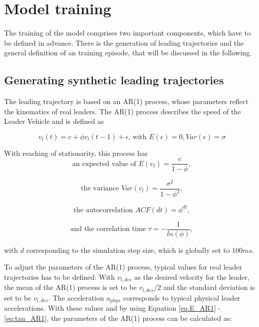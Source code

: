 \documentclass[review]{elsarticle}
\begin{document}
\section{Model training}
The training of the model comprises two important components, which have to be defined in advance. There is the generation of leading trajectories and the general definition of an training episode, that will be discussed in the following.

\subsection{Generating synthetic leading trajectories}
The leading trajectory is based on an AR(1) process, whose parameters reflect the kinematics of real leaders. The AR(1) process describes the speed of the Leader Vehicle and is defined as 

\begin{equation}
	v_l(t) = c+\phi v_l(t-1)+ \epsilon \text{, with } E(\epsilon) = 0, Var(\epsilon) = \sigma 
\end{equation}

With reaching of stationarity, this process has 
\begin{equation}
\label{eq:E_AR1}
 \text{an expected value of }E(v_l) = \frac{c}{1-\phi}, 
 \end{equation}
 
 \begin{equation}
 \label{eq:V_AR1}
 \text{the variance  }Var(v_l) = \frac{\sigma^2}{1-\phi^2}, 
 \end{equation}

 \begin{equation}
 \label{eq:ACF_AR1}
\text{the autocorrelation  }ACF(dt) = \phi^{dt}, 
\end{equation}

 \begin{equation}
 \label{eq:tau_AR1}
\text{and the correlation time  }\tau = -\frac{1}{ln(\phi)}, 
\end{equation}

with $d$ corresponding to the simulation step size, which is globally set to $100ms$. 

To adjust the parameters of the AR(1) process, typical values for real leader trajectories has to be defined: With $v_{l,des}$ as the desired velocity for the leader, the mean of the AR(1) process is set to be $v_{l,des}/2$ and the standard deviation is set to be $v_{l,des}$. The acceleration $a_{phys}$ corresponds to typical physical leader accelerations. With these values and by using Equation \ref{eq:E_AR1} - \ref{eq:tau_AR1}, the parameters of the AR(1) process can be calculated as:
\end{document}
